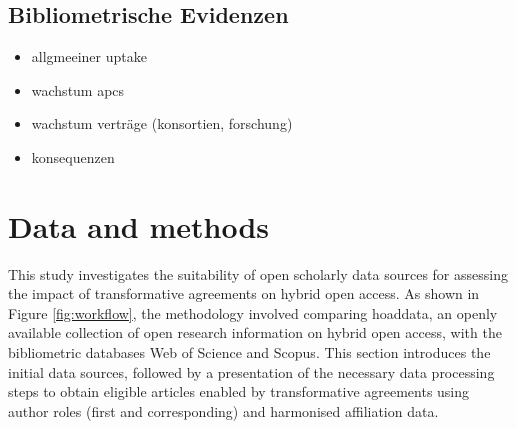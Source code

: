 \documentclass[a4paper,man,floatsintext,longtable,noextraspace,10pt]{apa6}
\providecommand{\tightlist}{%
  \setlength{\itemsep}{0pt}\setlength{\parskip}{0pt}}
\begin{document}
\subsection{Bibliometrische Evidenzen}\label{bibliometrische-evidenzen}

\begin{itemize}
\tightlist
\item
  allgmeeiner uptake
\item
  wachstum apcs
\item
  wachstum verträge (konsortien, forschung)
\item
  konsequenzen
\end{itemize}

\section{Data and methods}\label{data-and-methods}

This study investigates the suitability of open scholarly data sources
for assessing the impact of transformative agreements on hybrid open
access. As shown in Figure \ref{fig:workflow}, the methodology involved
comparing hoaddata, an openly available collection of open research
information on hybrid open access, with the bibliometric databases Web
of Science and Scopus. This section introduces the initial data sources,
followed by a presentation of the necessary data processing steps to
obtain eligible articles enabled by transformative agreements using
author roles (first and corresponding) and harmonised affiliation data.
\end{document}
